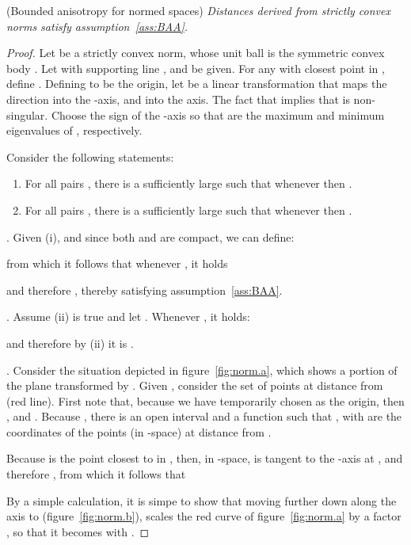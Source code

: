 \documentclass[11pt]{article}
\begin{document}
 (Bounded anisotropy for normed spaces)\emph{
	Distances derived from strictly convex  norms satisfy assumption~\ref{ass:BAA}.
}
\begin{proof}
Let  be a strictly convex  norm, whose unit ball is the symmetric convex body . 
Let  with supporting line , and  be given. 
For any  with closest point  in , define . 
Defining  to be the origin, let  be a linear transformation that maps the  direction into the -axis, 
	and  into the  axis. 
The fact that  implies that  is non-singular. 
Choose the sign of the -axis so that  
	are the maximum and minimum eigenvalues of , 	respectively. 

Consider the following statements:
\begin{enumerate}[i]
\item For all pairs , there is a sufficiently large  such that whenever 
	 then . 
\item For all pairs , there is a sufficiently large  such that whenever
	 then . 
\end{enumerate}
	
\vspace*{0.05in}. 	
Given (i), and since both  and  are compact, we can define:
	
from which it follows that whenever , it holds
	
	and therefore , thereby satisfying assumption~\ref{ass:BAA}. 


\vspace*{0.05in}. 	
Assume (ii) is true and let . 
	Whenever , it holds:

	and therefore by (ii) it is . 


. 
Consider the situation depicted in figure~\ref{fig:norm.a}, which shows a portion of the plane transformed by . 
Given , consider the set of points at distance  from  (red line). 
First note that, because we have temporarily chosen  as the origin, then , and . 
Because , there is an open interval  and 
	a function  such that , with  
	are the coordinates of the points (in -space) at distance  from . 

Because  is the point closest to  in , then, 
	in -space,  is tangent to the -axis at , 
	and therefore , from which it follows that
	

By a simple calculation, it is simpe to show that moving  further down along the  axis to 
	(figure~\ref{fig:norm.b}), 
	scales the red curve of figure~\ref{fig:norm.a} by a factor , so that it becomes 
	 with . 


\end{proof}
\end{document}
